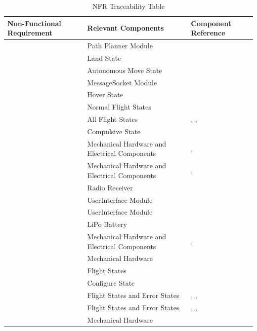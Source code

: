 \documentclass[12pt, titlepage]{article}
\begin{document}
\begin{table}[!h]
\begin{center}
\caption {NFR Traceability Table}
\label{tab:NFR_DesignTrace}
\begin{tabular}{ | m{2.5cm} | m{7.5cm} | m{6.5cm} | } 
\hline
Non-Functional Requirement & Relevant Components & Component Reference \\
\hline
\nameref{PERF_001} & Path Planner Module & \nameref{Path Plan App} \\ \hline
\nameref{PERF_002} & Land State & \nameref{FlightStates} \\ \hline
\nameref{PERF_003} & Autonomous Move State & \nameref{FlightStates} \\ \hline
\nameref{PERF_004} & MessageSocket Module & \nameref{MIS_MESSAGE_SOCKET} \\ \hline
\nameref{PERF_005} & Hover State & \nameref{FlightStates} \\ \hline
\nameref{PERF_006} & Normal Flight States & \nameref{FlightStates} \\ \hline
\nameref{PERF_007} & All Flight States & \nameref{FlightStates}, \nameref{NonFlightStates}, \nameref{ErrorStates} \\ \hline
\nameref{PERF_008} & Compulsive State & \nameref{FlightStates} \\ \hline
\nameref{DES_001} & Mechanical Hardware and Electrical Components & \nameref{sec:mechHardware}, \nameref{sec:elecComponents} \\ \hline
\nameref{STD_001} & Mechanical Hardware and Electrical Components & \nameref{sec:mechHardware}, \nameref{sec:elecComponents} \\ \hline
\nameref{STD_002} & Radio Receiver & \nameref{sec:elecComponents} \\ \hline
\nameref{SEC_001} & UserInterface Module & \nameref{MIS_USER_INTERFACE} \\ \hline
\nameref{SEC_002} & UserInterface Module & \nameref{MIS_USER_INTERFACE} \\ \hline
\nameref{MTNC_001} & LiPo Battery & \nameref{sec:elecComponents} \\ \hline
\nameref{MTNC_002} & Mechanical Hardware and Electrical Components & \nameref{sec:mechHardware}, \nameref{sec:elecComponents} \\ \hline
\nameref{MTNC_003} & Mechanical Hardware & \nameref{sec:mechHardware} \\ \hline
\nameref{SAFE_001} & Flight States & \nameref{FlightStates} \\ \hline
\nameref{SAFE_002} & Configure State & \nameref{NonFlightStates} \\ \hline
\nameref{SAFE_003} & Flight States and Error States & \nameref{FlightStates}, \nameref{NonFlightStates}, \nameref{ErrorStates} \\ \hline
\nameref{SAFE_004} & Flight States and Error States & \nameref{FlightStates}, \nameref{NonFlightStates}, \nameref{ErrorStates} \\ \hline
\nameref{SAFE_005} & Mechanical Hardware & \nameref{sec:mechHardware} \\ \hline
\end{tabular}
\end{center}
\end{table}
\end{document}
